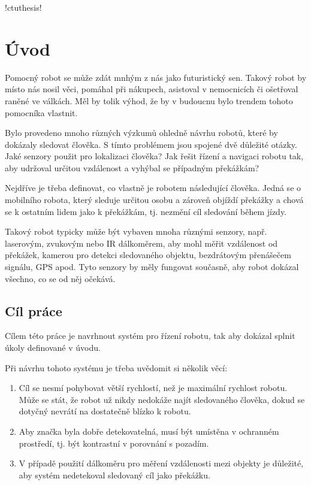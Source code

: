 \documentclass[twoside]{ctuthesis}
\theoremstyle{plain}
\theoremstyle{definition}
\theoremstyle{note}
\begin{document}
\renewcommand \ctulstsep {0pt}

\newcommand\ctuclsname{\leavevmode\unhcopy\ctuclsnamebox}
\newsavebox\ctuclsnamebox
\begin{lrbox}{\ctuclsnamebox}
\ctulst!ctuthesis!
\end{lrbox}

\maketitle

\chapter{Úvod}

Pomocný robot se může zdát mnhým z nás jako futuristický sen. Takový robot by místo nás nosil věci, pomáhal při nákupech, asistoval v nemocnicích či ošetřoval raněné ve válkách.  Měl by tolik výhod, že by v budoucnu bylo trendem tohoto pomocníka vlastnit.

Bylo provedeno mnoho různých výzkumů ohledně návrhu robotů, které by dokázaly sledovat člověka. S tímto problémem jsou spojené dvě důležité otázky. Jaké senzory použit pro lokalizaci člověka? Jak řešit řízení a navigaci robotu tak, aby udržoval určitou vzdálenost a vyhýbal se případným překážkám?

Nejdříve je třeba definovat, co vlastně je robotem následující člověka. Jedná se o mobilního robota, který sleduje určitou osobu
a zároveň objíždí překážky a chová se k ostatním lidem jako k překážkám, tj. nezmění cíl sledování během jízdy.

Takový robot typicky může být vybaven mnoha různými senzory, např. laserovým, zvukovým nebo IR dálkoměrem, aby mohl měřit vzdálenost od překážek, kamerou pro detekci sledovaného objektu, bezdrátovým přenášečem signálu, GPS apod. Tyto senzory by měly fungovat současně, aby robot dokázal všechno, co se od něj očekává.

\section{Cíl práce}
Cílem této práce je navrhnout systém pro řízení robotu, tak aby dokázal splnit úkoly definované v úvodu. 

Při návrhu tohoto systému je třeba uvědomit si několik věcí:
\begin{enumerate}
	\item Cíl se nesmí pohybovat větší rychlostí, než je maximální rychlost robotu. Může se stát, že robot už nikdy nedokáže najít sledovaného člověka, dokud se dotyčný nevrátí na dostatečně blízko k robotu.

	\item Aby značka byla dobře detekovatelná, musí být umístěna v ochranném prostředí, tj. být kontrastní v porovnání s pozadím.

	\item V případě použití dálkoměru pro měření vzdálenosti mezi objekty je důležité, aby systém nedetekoval sledovaný cíl jako překážku.
\end{enumerate}
\end{document}
